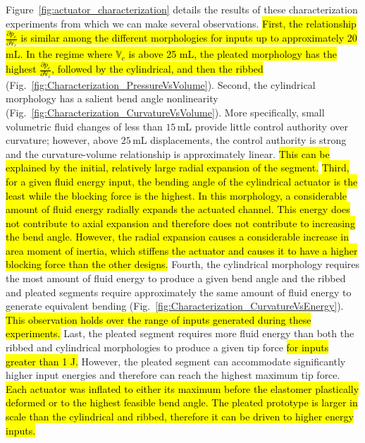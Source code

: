 Figure~\ref{fig:actuator_characterization} details the results of these characterization experiments from which we can make several observations.
%
\hl{First, the relationship $\frac{\partial p_c}{\partial \mathbb{V}_c}$ is similar among the different morphologies for inputs up to approximately 20 mL. In the regime where $\mathbb{V}_c$ is above 25 mL, the pleated morphology has the highest $\frac{\partial p_c}{\partial \mathbb{V}_c}$, followed by the cylindrical, and then the ribbed } (Fig.~\ref{fig:Characterization_PressureVsVolume}).
%
Second, the cylindrical morphology has a salient bend angle nonlinearity (Fig.~\ref{fig:Characterization_CurvatureVsVolume}).
%
More specifically, small volumetric fluid changes of less than $15\,$mL provide little control authority over curvature; however, above $25\,$mL displacements, the control authority is strong and the curvature-volume relationship is approximately linear.
%
\hl{This can be explained by the initial, relatively large radial expansion of the segment.}
%
\hl{Third, for a given fluid energy input, the bending angle of the cylindrical actuator is the least while the blocking force is the highest. In this morphology, a considerable amount of fluid energy radially expands the actuated channel. This energy does not contribute to axial expansion and therefore does not contribute to increasing the bend angle. However, the radial expansion causes a considerable increase in area moment of inertia, which stiffens the actuator and causes it to have a higher blocking force than the other designs.}
%
Fourth, the cylindrical morphology requires the most amount of fluid energy to produce a given bend angle and the ribbed and pleated segments require approximately the same amount of fluid energy to generate equivalent bending (Fig.~\ref{fig:Characterization_CurvatureVsEnergy}).
%
\hl{This observation holds over the range of inputs generated during these experiments.}
%
Last, the pleated segment requires more fluid energy than both the ribbed and cylindrical morphologies to produce a given tip force \hl{for inputs greater than 1 J.}
%
However, the pleated segment can accommodate significantly higher input energies and therefore can reach the highest maximum tip force.
%
\hl{Each actuator was inflated to either its maximum before the elastomer plastically deformed or to the highest feasible bend angle. The pleated prototype is larger in scale than the cylindrical and ribbed, therefore it can be driven to higher energy inputs.} 